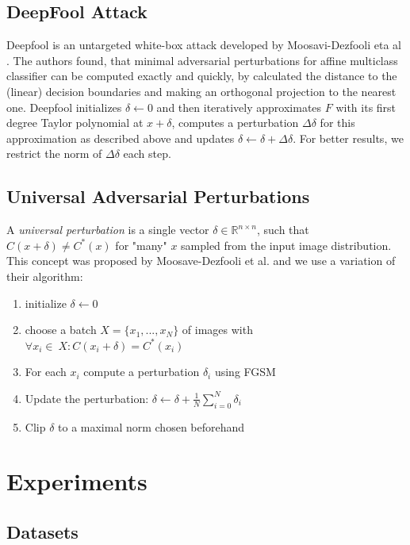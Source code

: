 \documentclass{article}
\begin{document}
\subsection{DeepFool Attack}
Deepfool is an untargeted white-box attack developed by Moosavi-Dezfooli eta al \cite{deepfool}.
The authors found, that minimal adversarial perturbations for affine multiclass classifier can be computed exactly and quickly,
by calculated the distance to the (linear) decision boundaries and making an orthogonal projection to the nearest one.
Deepfool initializes $\delta \gets 0$ and then iteratively approximates $F$ with its first degree Taylor polynomial at $x + \delta$, computes a perturbation $\Delta \delta$ for this approximation as described above and updates $\delta \gets \delta + \Delta \delta$.
For better results, we restrict the norm of $\Delta \delta$ each step.

\subsection{Universal Adversarial Perturbations}
A \emph{universal perturbation} is a single vector $\delta \in \mathbb{R}^{n\times n}$, such that $C(x + \delta) \neq C^*(x)$ for "many" $x$ sampled from the input image distribution.
This concept was proposed by Moosave-Dezfooli et al. \cite{universal} and we use a variation of their algorithm:
\begin{enumerate}
	\item initialize $\delta \gets 0$
	\item choose a batch $X = \{x_1, ..., x_N\}$ of images with $\forall x_i \in\ X:  C(x_i + \delta) = C^*(x_i)$
	\item For each $x_i$ compute a perturbation $\delta_i$ using FGSM \cite{fgsm}
	\item Update the perturbation: $\delta \gets \delta + \frac{1}{N} \sum\limits_{i=0}^N \delta_i$
	\item Clip $\delta$ to a maximal norm chosen beforehand
\end{enumerate}


\section{Experiments}
\label{lab:experiments}

\subsection{Datasets}
\end{document}
